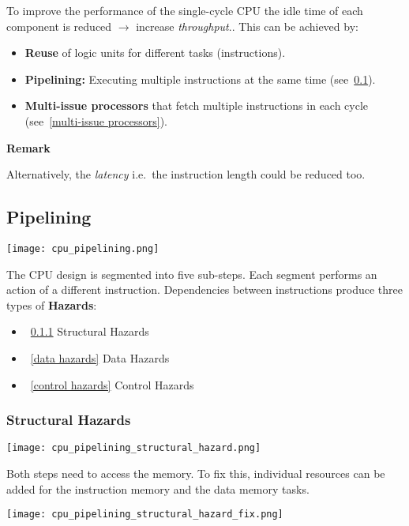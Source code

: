 \begin{multicols*}{3}
    To improve the performance of the single-cycle CPU the idle time of each component is reduced  $\to$ increase \textit{throughput}.. This can be achieved by:

    \begin{itemize}
        \item \textbf{Reuse} of logic units for different tasks (instructions).
        \item \textbf{Pipelining:} Executing multiple instructions at the same time (see~\ref{pipelining}).
        \item \textbf{Multi-issue processors} that fetch multiple instructions in each cycle (see~\ref{multi-issue processors}).
    \end{itemize}

    \textbf{Remark} 
    
    Alternatively, the \textit{latency} i.e.\ the instruction length could be reduced too.

    \subsection{Pipelining}\label{pipelining}

    \texttt{[image: cpu\_pipelining.png]}

    The CPU design is segmented into five sub-steps. Each segment performs an action of a different instruction.
    \newpar{}
    Dependencies between instructions produce three types of \textbf{Hazards}:
    \begin{itemize}
        \item~\ref{structural hazards} Structural Hazards
        \item~\ref{data hazards} Data Hazards
        \item~\ref{control hazards} Control Hazards
    \end{itemize}

    \subsubsection{Structural Hazards}\label{structural hazards}

    \texttt{[image: cpu\_pipelining\_structural\_hazard.png]}

    Both steps need to access the memory. To fix this, individual resources can be added for the instruction memory and the data memory tasks.

    \begin{center}
        \texttt{[image: cpu\_pipelining\_structural\_hazard\_fix.png]}
    \end{center}


\end{multicols*}
